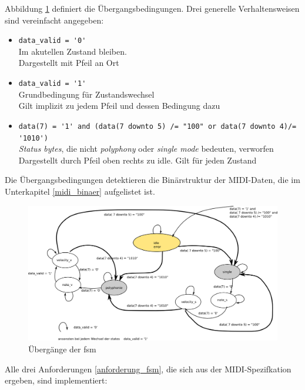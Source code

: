 Abbildung \ref{fig.midi_fsm_detail} definiert die Übergangsbedingungen. Drei generelle Verhaltensweisen sind vereinfacht angegeben:

\begin{itemize}
	\item \lstinline|data_valid = '0'|\\
        Im akutellen Zustand bleiben.\\
        Dargestellt mit Pfeil an Ort
	\item \lstinline|data_valid = '1'|\\
        Grundbedingung für Zustandswechsel\\
        Gilt implizit zu jedem Pfeil und dessen Bedingung dazu
	\item \lstinline|data(7) = '1' and (data(7 downto 5) /= "100" or data(7 downto 4)/= '1010')| \\
        \textit{Status bytes}, die nicht \textit{polyphony} oder \textit{single mode} bedeuten, verworfen\\
        Dargestellt durch Pfeil oben rechts zu idle. Gilt für jeden Zustand
\end{itemize}
\bigskip

Die Übergangsbedingungen detektieren die Binärstruktur der MIDI-Daten, die im Unterkapitel \ref{midi_binaer} aufgelistet ist.

\begin{figure}[H]
	\includegraphics[width=1\textwidth]{images/midi_control/fsm_detailliert.png}
	\caption{Übergänge der fsm}
	\label{fig.midi_fsm_detail}
\end{figure}

Alle drei Anforderungen \ref{anforderung_fsm}, die sich aus der MIDI-Spezifkation ergeben, sind implementiert:

